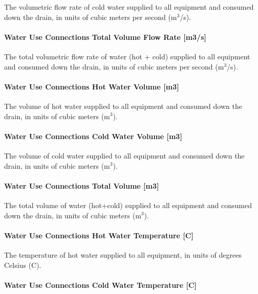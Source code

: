 The volumetric flow rate of cold water supplied to all equipment and consumed down the drain, in units of cubic meters per second (m\(^{3}\)/s).

\paragraph{Water Use Connections Total Volume Flow Rate {[}m3/s{]}}\label{water-use-connections-total-volume-flow-rate-m3s}

The total volumetric flow rate of water (hot + cold) supplied to all equipment and consumed down the drain, in units of cubic meters per second (m\(^{3}\)/s).

\paragraph{Water Use Connections Hot Water Volume {[}m3{]}}\label{water-use-connections-hot-water-volume-m3}

The volume of hot water supplied to all equipment and consumed down the drain, in units of cubic meters (m\(^{3}\)).

\paragraph{Water Use Connections Cold Water Volume {[}m3{]}}\label{water-use-connections-cold-water-volume-m3}

The volume of cold water supplied to all equipment and consumed down the drain, in units of cubic meters (m\(^{3}\)).

\paragraph{Water Use Connections Total Volume {[}m3{]}}\label{water-use-connections-total-volume-m3}

The total volume of water (hot+cold) supplied to all equipment and consumed down the drain, in units of cubic meters (m\(^{3}\)).

\paragraph{Water Use Connections Hot Water Temperature {[}C{]}}\label{water-use-connections-hot-water-temperature-c}

The temperature of hot water supplied to all equipment, in units of degrees Celsius (C).

\paragraph{Water Use Connections Cold Water Temperature {[}C{]}}\label{water-use-connections-cold-water-temperature-c}

